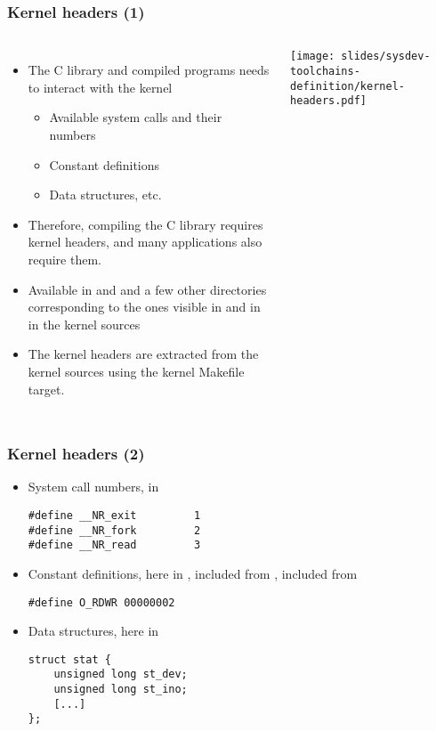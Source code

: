 \begin{frame}
  \frametitle{Kernel headers (1)}
  \begin{columns}
    \begin{itemize}
    \item The C library and compiled programs needs to interact with the kernel
      \begin{itemize}
      \item Available system calls and their numbers
      \item Constant definitions
      \item Data structures, etc.
      \end{itemize}
    \item Therefore, compiling the C library requires kernel headers, and many
      applications also require them.
    \item Available in  and  and a few
      other directories corresponding to the ones visible in
       and in  in the kernel sources
    \item The kernel headers are extracted from the kernel sources using
      the  kernel Makefile target.
    \end{itemize}
    \texttt{[image: slides/sysdev-toolchains-definition/kernel-headers.pdf]}
  \end{columns}
\end{frame}

\begin{frame}[fragile]
  \frametitle{Kernel headers (2)}
  \begin{itemize}
  \item System call numbers, in 
\begin{verbatim}
#define __NR_exit         1
#define __NR_fork         2
#define __NR_read         3
\end{verbatim}
  \item Constant definitions, here in ,
    included from , included from
\begin{verbatim}
#define O_RDWR 00000002
\end{verbatim}
\item Data structures, here in 
\begin{verbatim}
struct stat {
    unsigned long st_dev;
    unsigned long st_ino;
    [...]
};
\end{verbatim}
\end{itemize}
\end{frame}

